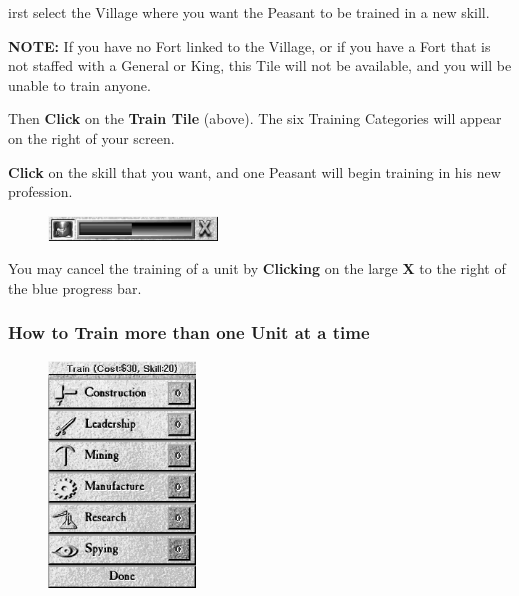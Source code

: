 irst select the Village where you want the Peasant to be trained in a new skill.


\textbf{NOTE:} If you have no Fort linked to the Village, or if you have a Fort that is not staffed with a General or King, this Tile will not be available, and you will be unable to train anyone.

Then \textbf{Click} on the \textbf{Train Tile} (above). The six Training Categories will appear on the right of your screen.

\textbf{Click} on the skill that you want, and one Peasant will begin training in his new profession.

\begin{figure}
    \vspace{-20pt}
    \begin{center}
        \includegraphics[width=0.4\textwidth]{Itrainprogress} %
    \end{center}
    \vspace{-15pt}
\end{figure}


You may cancel the training of a unit by \textbf{Clicking} on the large \textbf{X} to the right of the blue progress bar.

\subsubsection{\textsf{How to Train more than one Unit at a time}}


\begin{figure}
    \vspace{-20pt}
    \begin{center}
        \includegraphics[width=0.35\textwidth]{Itrain} %
    \end{center}
    \vspace{-20pt}
\end{figure}

